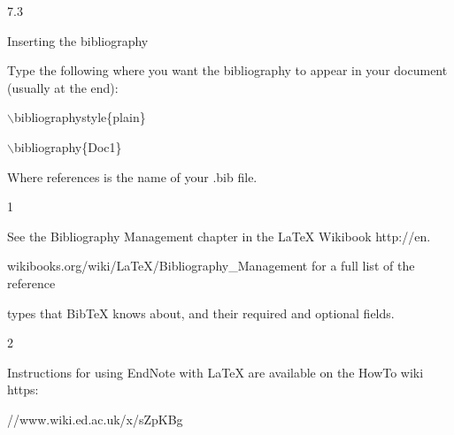 \documentclass[a4paper,portrait,12pt]{article}
\begin{document}
7.3





\begin{flushleft}
Inserting the bibliography
\end{flushleft}





\begin{flushleft}
Type the following where you want the bibliography to appear in your document (usually at the end):
\end{flushleft}


\begin{flushleft}
\ensuremath{\backslash}bibliographystyle\{plain\}
\end{flushleft}


\begin{flushleft}
\ensuremath{\backslash}bibliography\{Doc1\}
\end{flushleft}


\begin{flushleft}
Where references is the name of your .bib file.
\end{flushleft}





1





\begin{flushleft}
See the Bibliography Management chapter in the LaTeX Wikibook http://en.
\end{flushleft}


\begin{flushleft}
wikibooks.org/wiki/LaTeX/Bibliography\_Management for a full list of the reference
\end{flushleft}


\begin{flushleft}
types that BibTeX knows about, and their required and optional fields.
\end{flushleft}


2


\begin{flushleft}
Instructions for using EndNote with LaTeX are available on the HowTo wiki https:
\end{flushleft}


\begin{flushleft}
//www.wiki.ed.ac.uk/x/sZpKBg
\end{flushleft}
\end{document}
